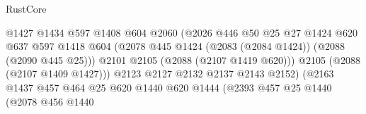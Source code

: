 \begin{lexlean}{RustCore}
\begin{coremodule}
                                              @1427
                                              @1434
                                              @597
                                              @1408
                                              @604
                                              @2060
                                              (@2026
                                                @446
                                                @50
                                                @25
                                                @27
                                                @1424
                                                @620
                                                @637
                                                @597
                                                @1418
                                                @604
                                                (@2078
                                                  @445
                                                  @1424
                                                  (@2083 (@2084 @1424))
                                                  (@2088 (@2090 @445 @25)))
                                                @2101
                                                @2105
                                                (@2088 (@2107 @1419 @620)))
                                              @2105
                                              (@2088 (@2107 @1409 @1427)))
                                            @2123
                                            @2127
                                            @2132
                                            @2137
                                            @2143
                                            @2152)
                                          (@2163
                                            @1437
                                            @457
                                            @464
                                            @25
                                            @620
                                            @1440
                                            @620
                                            @1444
                                            (@2393
                                              @457
                                              @25
                                              @1440
                                              (@2078
                                                @456
                                                @1440

\end{coremodule}
\end{lexlean}

